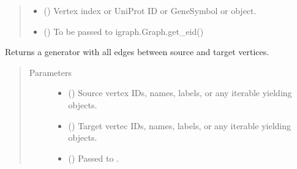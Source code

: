 \documentclass[letterpaper,10pt,english]{sphinxmanual}
\begin{document}
\begin{fulllineitems}
\begin{fulllineitems}
\begin{quote}
\begin{description}
\begin{itemize}
\item {} 
 (\sphinxstyleliteralemphasis{\sphinxupquote{,}}) \textendash{} Vertex index or UniProt ID or GeneSymbol or 
object.

\item {} 
 () \textendash{} To be passed to igraph.Graph.get\_eid()

\end{itemize}

\end{description}\end{quote}

\end{fulllineitems}


\begin{fulllineitems}
\label{\detokenize{reference:pypath.main.PyPath.get_edges}}
Returns a generator with all edges between source and target vertices.
\begin{quote}\begin{description}
\item[{Parameters}] \leavevmode\begin{itemize}
\item {} 
 () \textendash{} Source vertex IDs, names, labels, or any iterable yielding
 objects.

\item {} 
 () \textendash{} Target vertec IDs, names, labels, or any iterable yielding
 objects.

\item {} 
 () \textendash{} Passed to .


\end{itemize}
\end{description}
\end{quote}
\end{fulllineitems}
\end{fulllineitems}
\end{document}

